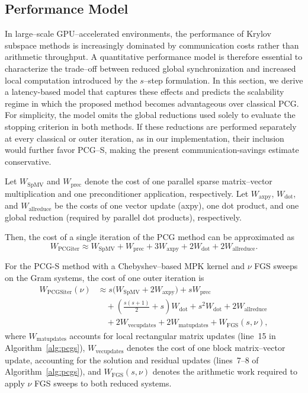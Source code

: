 \documentclass[pdflatex,sn-mathphys-num]{sn-jnl}%
\begin{document}
\subsection{Performance Model}
\label{sec:costperiter}

In large--scale GPU--accelerated environments, the performance of Krylov subspace methods is increasingly dominated by communication costs rather than arithmetic throughput. A quantitative performance model is therefore essential to characterize the trade--off between reduced global synchronization and increased local computation introduced by the $s$--step formulation. In this section, we derive a latency-based model that captures these effects and predicts the scalability regime in which the proposed method becomes advantageous over classical PCG. For simplicity, the model omits the global reductions used solely to
evaluate the stopping criterion in both methods. If these reductions
are performed separately at every classical or outer iteration, as in our implementation, their
inclusion would further favor PCG--S, making the present
communication-savings estimate conservative.

Let \( W_{\mathrm{SpMV}} \) and \( W_{\mathrm{prec}} \) denote the cost of one parallel sparse matrix--vector
multiplication and one preconditioner application, respectively.
Let \( W_{\mathrm{axpy}} \), \( W_{\mathrm{dot}} \), and \( W_{\mathrm{allreduce}} \) be the costs of one vector update
(axpy), one dot product, and one global reduction (required by parallel dot products), respectively.

Then, the cost of a single iteration of the PCG method can be approximated as
\[
W_{\mathrm{PCGiter}} \approx
W_{\mathrm{SpMV}} + W_{\mathrm{prec}} + 3 W_{\mathrm{axpy}} + 2 W_{\mathrm{dot}} + 2 W_{\mathrm{allreduce}}.
\]

For the PCG-S method with a Chebyshev--based MPK kernel and
\(\nu\) FGS sweeps on the Gram systems,
the cost of one outer iteration is
\begin{align*}
W_{\mathrm{PCGSiter}}(\nu)
&\approx
s\bigl(W_{\mathrm{SpMV}}+2W_{\mathrm{axpy}}\bigr)
+sW_{\mathrm{prec}}
\\
&\quad
+\left(\frac{s(s+1)}{2}+s\right)W_{\mathrm{dot}}
+s^2W_{\mathrm{dot}}
+2W_{\mathrm{allreduce}}
\\
&\quad
+2W_{\mathrm{vecupdates}}
+2W_{\mathrm{matupdates}}
+W_{\mathrm{FGS}}(s,\nu),
\end{align*}
where \( W_{\mathrm{matupdates}} \) accounts for local rectangular matrix updates (line~15 in Algorithm~\ref{alg:pcgs}), $W_{\mathrm{vecupdates}}$ denotes the cost of one block
matrix--vector update, accounting for the solution and residual
updates (lines~7--8 of Algorithm~\ref{alg:pcgs}), and $W_{\mathrm{FGS}}(s,\nu)$ denotes the arithmetic work required
to apply $\nu$ FGS sweeps to both reduced systems. 
\end{document}

